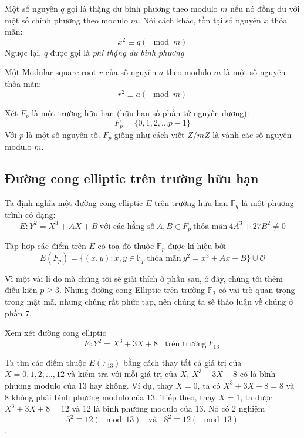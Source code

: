 \begin{definition}
	Một số nguyên $q$ gọi là thặng dư bình phương theo modulo $m$ nếu nó đồng dư với một số chính phương theo modulo $m$.
	Nói cách khác, tồn tại số nguyên $x$ thỏa mãn:
	$$x^2 \equiv q (\mod{m})$$
	Ngược lại, $q$ được gọi là \textit{phi thặng dư bình phương}

\end{definition}

\begin{definition}
	Một Modular square root $r$ của số nguyên $a$ theo modulo $m$ là một số nguyên thỏa mãn:
	$$r^2 \equiv a (\mod{m})$$
\end{definition}

Xét $F_p$ là một trường hữu hạn (hữu hạn số phần tử nguyên dương):
$$F_p = \{0, 1, 2, \ldots p-1\}$$
Với $p$ là một số nguyên tố. $F_p$ giống như cách viết $Z/mZ$ là vành các số nguyên modulo $m$.
\subsection{Đường cong elliptic trên trường hữu hạn}

Ta định nghĩa một đường cong elliptic $E$ trên trường hữu hạn $\mathbb{F}_q$ là một phương trình có dạng:
$$E: Y^2 = X^3 + AX + B\ \text{với các hằng số}\ A, B \in F_p\ \text{thỏa mãn}\ 4A^3 + 27B^2 \neq 0$$


Tập hợp các điểm trên $E$ có toạ độ thuộc $\mathbb{F} _p$ được kí hiệu bởi
$$E(F_p) = \{(x, y) : x, y \in \mathbb{F}_p\ \text{thỏa mãn}\ y^2 = x^3 + A x + B\} \cup \mathcal{O}$$

\begin{remark}
	Vì một vài lí do mà chúng tôi sẽ giải thích ở phần sau, ở đây, chúng tôi thêm điều kiện $p \geq 3$.
	Những đường cong Elliptic trên trường $\mathbb{F}_2$ có vai trò quan trọng trong mật mã, nhưng chúng rất phức tạp, nên chúng ta sẽ thảo luận về chúng ở phần 7.
\end{remark}

\begin{example}
	\label{ex:ex4}
	Xem xét đường cong elliptic
	$$E: Y^2 = X^3 + 3X + 8 \ \ \ \ \text{trên trường}\  F_{13}\ $$
\end{example}

Ta tìm các điểm thuộc $E(\mathbb{F}_{13})$ bằng cách thay tất cả giá trị của $X = 0,1,2,\ldots,12$ và kiểm tra với mỗi giá trị của $X$, $X^3 + 3X + 8$ có là bình phương modulo của 13 hay không.
Ví dụ, thay $X = 0$, ta có $X^3+3X+8 = 8$ và 8 không phải bình phương modulo của 13.
Tiếp theo, thay $X = 1$, ta được $X^3+3X+8 = 12$ và 12 là bình phương modulo của 13. Nó có 2 nghiệm
$$5^2 \equiv 12 (\mod{13}) \ \ \ \ \text{và} \ \ \ \ 8^2 \equiv 12 (\mod 13)$$.

